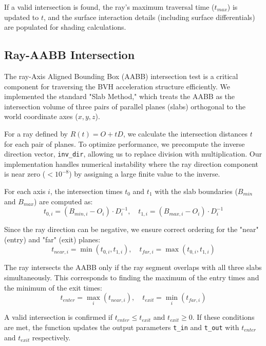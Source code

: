 \documentclass[acmtog]{acmart}
\begin{document}
If a valid intersection is found, the ray's maximum traversal time ($t_{max}$) is updated to $t$, and the surface interaction details (including surface differentials) are populated for shading calculations.
\subsection{Ray-AABB Intersection}
The ray-Axis Aligned Bounding Box (AABB) intersection test is a critical component for traversing the BVH acceleration structure efficiently. We implemented the standard "Slab Method," which treats the AABB as the intersection volume of three pairs of parallel planes (slabs) orthogonal to the world coordinate axes ($x, y, z$).

For a ray defined by $R(t) = O + tD$, we calculate the intersection distances $t$ for each pair of planes. To optimize performance, we precompute the inverse direction vector, \texttt{inv\_dir}, allowing us to replace division with multiplication. Our implementation handles numerical instability where the ray direction component is near zero ($< 10^{-8}$) by assigning a large finite value to the inverse.

For each axis $i$, the intersection times $t_0$ and $t_1$ with the slab boundaries ($B_{min}$ and $B_{max}$) are computed as:
\begin{equation}
    t_{0,i} = (B_{min,i} - O_i) \cdot D^{-1}_i, \quad t_{1,i} = (B_{max,i} - O_i) \cdot D^{-1}_i
\end{equation}

Since the ray direction can be negative, we ensure correct ordering for the "near" (entry) and "far" (exit) planes:
\begin{equation}
    t_{near, i} = \min(t_{0,i}, t_{1,i}), \quad t_{far, i} = \max(t_{0,i}, t_{1,i})
\end{equation}

The ray intersects the AABB only if the ray segment overlaps with all three slabs simultaneously. This corresponds to finding the maximum of the entry times and the minimum of the exit times:
\begin{equation}
    t_{enter} = \max_i(t_{near, i}), \quad t_{exit} = \min_i(t_{far, i})
\end{equation}

A valid intersection is confirmed if $t_{enter} \le t_{exit}$ and $t_{exit} \ge 0$. If these conditions are met, the function updates the output parameters \texttt{t\_in} and \texttt{t\_out} with $t_{enter}$ and $t_{exit}$ respectively.
\end{document}
